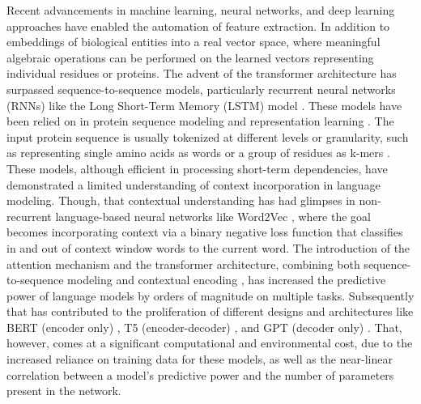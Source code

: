 \documentclass[utf8]{article}
\begin{document}
	Recent advancements in machine learning, neural networks, and deep learning approaches have enabled the automation of feature extraction. In addition to embeddings of biological entities into a real vector space, where meaningful algebraic operations can be performed on the learned vectors representing individual residues or proteins. The advent of the transformer architecture \cite{vaswani_attentionallyou_2017} has surpassed sequence-to-sequence models, particularly recurrent neural networks (RNNs) like the Long Short-Term Memory (LSTM) model \cite{hochreiter_longshorttermmemory_1997}. These models have been relied on in protein sequence modeling and representation learning \cite{cho_learningphraserepresentations_2014}. The input protein sequence is usually tokenized at different levels or granularity, such as representing single amino acids as words or a group of residues as k-mers \cite{guo_usingsupportvector_2008}. These models, although efficient in processing short-term dependencies, have demonstrated a limited understanding of context incorporation in language modeling. Though, that contextual understanding has had glimpses in non-recurrent language-based neural networks like Word2Vec \cite{mikolov_distributedrepresentationswords_2013}, where the goal becomes incorporating context via a binary negative loss function that classifies in and out of context window words to the current word. The introduction of the attention mechanism and the transformer architecture, combining both sequence-to-sequence modeling and contextual encoding \cite{vaswani_attentionallyou_2017}, has increased the predictive power of language models by orders of magnitude on multiple tasks. Subsequently that has contributed to the proliferation of different designs and architectures like BERT (encoder only) \cite{devlin_bertpretrainingdeep_2019}, T5 (encoder-decoder) \cite{raffel_exploringlimitstransfer_2023}, and GPT (decoder only) \cite{brown_languagemodelsare_2020}. That, however, comes at a significant computational and environmental cost, due to the increased reliance on training data for these models, as well as the near-linear correlation between a model's predictive power and the number of parameters present in the network. 
	
\end{document}
